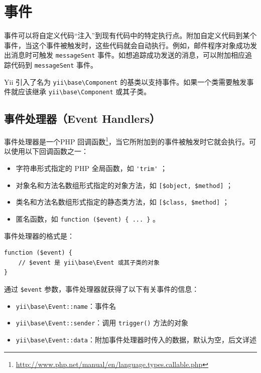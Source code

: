 \label{concept-events.md}\section{事件}
事件可以将自定义代码“注入”到现有代码中的特定执行点。附加自定义代码到某个事件，当这个事件被触发时，这些代码就会自动执行。例如，邮件程序对象成功发出消息时可触发 \lstinline|messageSent| 事件。如想追踪成功发送的消息，可以附加相应追踪代码到 \lstinline|messageSent| 事件。

Yii 引入了名为 \texttt{yii{\allowbreak{}\textbackslash}base{\allowbreak{}\textbackslash}Component} 的基类以支持事件。如果一个类需要触发事件就应该继承 \texttt{yii{\allowbreak{}\textbackslash}base{\allowbreak{}\textbackslash}Component} 或其子类。

\subsection{事件处理器（Event Handlers）}
事件处理器是一个PHP 回调函数\footnote{\url{http://www.php.net/manual/en/language.types.callable.php}}，当它所附加到的事件被触发时它就会执行。可以使用以下回调函数之一：

\begin{itemize}
\item 字符串形式指定的 PHP 全局函数，如 \lstinline|'trim'| ；
\item 对象名和方法名数组形式指定的对象方法，如 \lstinline|[$object, $method]| ；
\item 类名和方法名数组形式指定的静态类方法，如 \lstinline|[$class, $method]| ；
\item 匿名函数，如 \lstinline|function ($event) { ... }| 。
\end{itemize}
事件处理器的格式是：

\lstset{language=php}\begin{lstlisting}
function ($event) {
    // $event 是 yii\base\Event 或其子类的对象
}
\end{lstlisting}
通过 \lstinline|$event| 参数，事件处理器就获得了以下有关事件的信息：

\begin{itemize}
\item \texttt{yii{\allowbreak{}\textbackslash}base{\allowbreak{}\textbackslash}Event\allowbreak{}::\allowbreak{}name}：事件名
\item \texttt{yii{\allowbreak{}\textbackslash}base{\allowbreak{}\textbackslash}Event\allowbreak{}::\allowbreak{}sender}：调用 \lstinline|trigger()| 方法的对象
\item \texttt{yii{\allowbreak{}\textbackslash}base{\allowbreak{}\textbackslash}Event\allowbreak{}::\allowbreak{}data}：附加事件处理器时传入的数据，默认为空，后文详述
\end{itemize}
